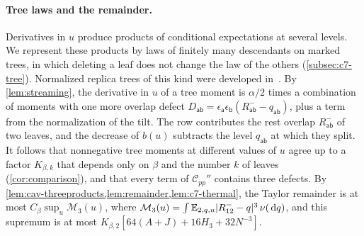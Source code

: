 \paragraph{Tree laws and the remainder.}
Derivatives in $u$ produce products of conditional expectations at
several levels. We represent these products by laws of finitely many
descendants on marked trees, in which deleting a leaf does not change
the law of the others (\cref{subsec:c7-tree}). Normalized replica trees of this
kind were developed in~\cite[Section~2]{OpenAIFluctuationScale}. By
\cref{lem:streaming}, the derivative in $u$ of a tree moment is
$\alpha/2$ times a combination of moments with one more overlap defect
$D_{\mathsf{ab}}=\epsilon_{\mathsf a}\epsilon_{\mathsf b}(R^-_{\mathsf{ab}}-q_{\mathsf{ab}})$,
plus a term from the normalization of the tilt. The row contributes the
rest overlap $R^-_{\mathsf{ab}}$ of two leaves, and the decrease of
$b(u)$ subtracts the level $q_{\mathsf{ab}}$ at which they split. It
follows that nonnegative tree moments at different values of $u$ agree
up to a factor $K_{\beta,k}$ that depends only on $\beta$ and the
number $k$ of leaves (\cref{cor:comparison}), and that every term of
$\mathcal C_{pp}''$ contains three defects. By
\cref{lem:cav-threeproducts,lem:remainder,lem:c7-thermal}, the Taylor
remainder is at most $C_\beta\sup_u\mathcal M_3(u)$, where
$\mathcal M_3(u)=\int\mathbb E_{2,q,u}|R^-_{12}-q|^3\,\nu(\,\mathrm d q)$, and this
supremum is at most $K_{\beta,2}[64(A+J)+16H_3+32N^{-3}]$.

